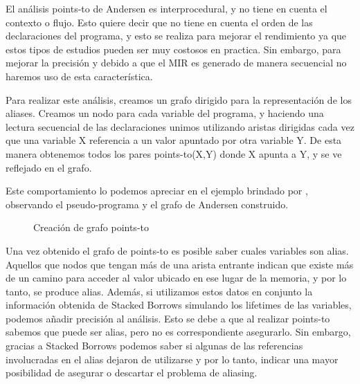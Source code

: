 El análisis points-to de Andersen es interprocedural, y no tiene en cuenta el contexto o flujo. Esto quiere decir que no tiene en cuenta el orden de las declaraciones del programa, y esto se realiza para mejorar el rendimiento ya que estos tipos de estudios pueden ser muy costosos en practica. Sin embargo, para mejorar la precisión y debido a que el MIR es generado de manera secuencial no haremos uso de esta característica.

Para realizar este análisis, creamos un grafo dirigido para la representación de los aliases. Creamos un nodo para cada variable del programa, y haciendo una lectura secuencial de las declaraciones unimos utilizando aristas dirigidas cada vez que una variable X referencia a un valor apuntado por otra variable Y. De esta manera obtenemos todos los pares points-to(X,Y) donde X apunta a Y, y se ve reflejado en el grafo.

Este comportamiento lo podemos apreciar en el ejemplo brindado por \cite{pointeranalysis}, observando el pseudo-programa y el grafo de Andersen construido.

\begin{figure}%
    \centering
    \qquad
    \caption{Creación de grafo points-to}%
\end{figure}

Una vez obtenido el grafo de points-to es posible saber cuales variables son alias. Aquellos que nodos que tengan más de una arista entrante indican que existe más de un camino para acceder al valor ubicado en ese lugar de la memoria, y por lo tanto, se produce alias. Además, si utilizamos estos datos en conjunto la información obtenida de Stacked Borrows simulando los lifetimes de las variables, podemos añadir precisión al análisis. Esto se debe a que al realizar points-to sabemos que puede ser alias, pero no es correspondiente asegurarlo. Sin embargo, gracias a Stacked Borrows podemos saber si algunas de las referencias involucradas en el alias dejaron de utilizarse y por lo tanto, indicar una mayor posibilidad de asegurar o descartar el problema de aliasing.

